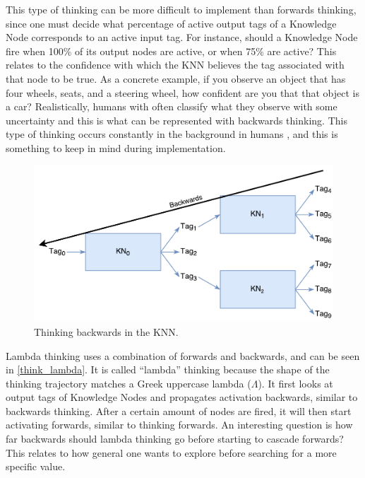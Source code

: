 \documentclass[titlepage,11pt]{article}
\begin{document}
This type of thinking can be more difficult to implement than forwards thinking, since one must decide what percentage of active output tags of a Knowledge Node corresponds to an active input tag. For instance, should a Knowledge Node fire when 100\% of its output nodes are active, or when 75\% are active? This relates to the confidence with which the KNN believes the tag associated with that node to be true. As a concrete example, if you observe an object that has four wheels, seats, and a steering wheel, how confident are you that that object is a car? Realistically, humans with often classify what they observe with some uncertainty \cite{uncertainty} and this is what can be represented with backwards thinking. This type of thinking occurs constantly in the background in humans \cite{vybihal-knowledge}, and this is something to keep in mind during implementation.

\begin{figure}[!htb]
	\includegraphics[width=\columnwidth]{figures/backwards_thinking.pdf}
	\caption{Thinking backwards in the KNN.}
	\label{think_backwards}
\end{figure}

Lambda thinking uses a combination of forwards and backwards, and can be seen in \autoref{think_lambda}. It is called ``lambda'' thinking because the shape of the thinking trajectory matches a Greek uppercase lambda ($\Lambda$). It first looks at output tags of Knowledge Nodes and propagates activation backwards, similar to backwards thinking. After a certain amount of nodes are fired, it will then start activating forwards, similar to thinking forwards. An interesting question is how far backwards should lambda thinking go before starting to cascade forwards? This relates to how general one wants to explore before searching for a more specific value.
\end{document}
